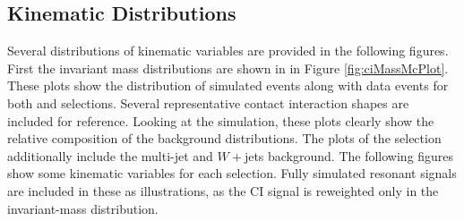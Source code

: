 \subsection{Kinematic Distributions}

Several distributions of kinematic variables are provided in the following figures.
First the invariant mass distributions are shown in in Figure \ref{fig:ciMassMcPlot}.
These plots show the distribution of simulated events along with data events for both \ee and \mm selections.
Several representative contact interaction shapes are included for reference.
Looking at the simulation, these plots clearly show the relative composition of the background distributions.
The plots of the \ee selection additionally include the multi-jet and $W+$jets background.
The following figures show some kinematic variables for each selection.
Fully simulated resonant signals are included in these as illustrations, as the CI signal is reweighted only in the invariant-mass distribution.

